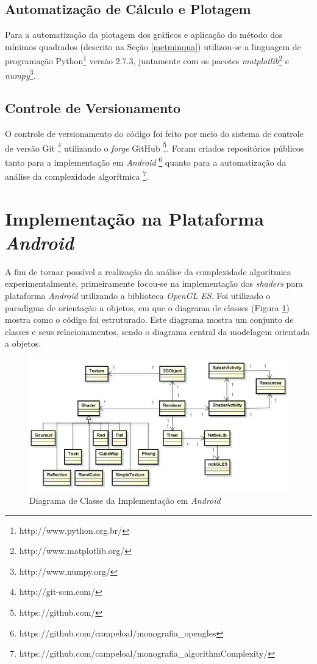 \subsection{Automatização de Cálculo e Plotagem}

	Para a automatização da plotagem dos gráficos e aplicação do método dos mínimos quadrados (descrito na Seção \ref{metminqua}) utilizou-se a linguagem de programação Python\footnote{http://www.python.org.br/} versão 2.7.3, juntamente com os pacotes  \textit{matplotlib}\footnote{http://www.matplotlib.org/} e  \textit{numpy}\footnote{http://www.numpy.org/}. 

\subsection{Controle de Versionamento}

	O controle de versionamento do código foi feito por meio do sistema de controle de versão Git \footnote{http://git-scm.com/} utilizando o \textit{forge} GitHub \footnote{https://github.com/}. Foram criados repositórios públicos tanto para a implementação em \textit{Android} \footnote{https://github.com/campeloal/monografia\_opengles} quanto para a automatização da análise da complexidade algorítmica \footnote{https://github.com/campeloal/monografia\_algorithmComplexity/}. 

\section{Implementação na Plataforma \textit{Android}} 
\label{imp}

	 A fim de tornar possível a realização da análise da complexidade algorítmica experimentalmente, primeiramente focou-se na implementação dos \textit{shaders} para plataforma \textit{Android} utilizando a biblioteca \textit{OpenGL ES}. Foi utilizado  o paradigma de orientação a objetos, em que o diagrama de classes (Figura \ref{class_diagram}) mostra como o código foi estruturado. Este diagrama mostra um conjunto de classes e seus relacionamentos, sendo o diagrama central da modelagem orientada a objetos. 

	\begin{figure}[ht]
	\centering
		\includegraphics[keepaspectratio=true,scale=0.6]{figuras/class_diagram.jpg}
	\caption{Diagrama de Classe da Implementação em \textit{Android}}
	\label{class_diagram}
	\end{figure}

